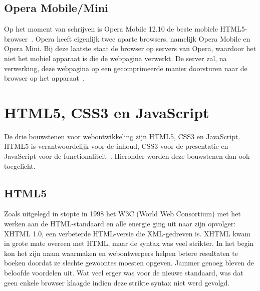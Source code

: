 \subsection{Opera Mobile/Mini}
Op het moment van schrijven is Opera Mobile 12.10 de beste mobiele HTML5-browser~\cite{Sights2012}. 
Opera heeft eigenlijk twee aparte browsers, namelijk Opera Mobile en Opera Mini. 
Bij deze laatste staat de browser  op servers van Opera, waardoor het niet het mobiel apparaat is die de webpagina verwerkt. 
De server zal, na verwerking, deze webpagina op een gecomprimeerde manier doorsturen naar de browser op het apparaat~\cite{PhilDutson2012}.



\section{HTML5, CSS3 en JavaScript}
\label{sec:html5-css3-js}
De drie bouwstenen voor webontwikkeling zijn HTML5, CSS3 en JavaScript. 
HTML5 is verantwoordelijk voor de inhoud, CSS3 voor de presentatie en JavaScript voor de functionaliteit~\cite{PhilDutson2012}. 
Hieronder worden deze bouwstenen dan ook toegelicht.

\subsection{HTML5}
Zoals uitgelegd in \cite{MacDonald2011} stopte in 1998 het W3C (World Web Consortium) met het werken aan de HTML-standaard en alle energie ging uit naar zijn opvolger: XHTML 1.0, een verbeterde HTML-versie die XML-gedreven is. 
XHTML kwam in grote mate overeen met HTML, maar de syntax was veel strikter. 
In het begin kon het zijn naam waarmaken en webontwerpers helpen betere resultaten te boeken doordat ze slechte gewoontes moesten opgeven. 
Jammer genoeg bleven de beloofde voordelen uit. 
Wat veel erger was voor de nieuwe standaard, was dat geen enkele browser klaagde indien deze strikte syntax niet werd gevolgd.

